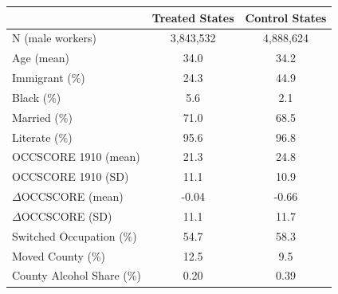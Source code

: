 
\begin{tabular}{lcc}
\toprule
 & Treated States & Control States\\
\midrule
N (male workers) & 3,843,532 & 4,888,624\\
Age (mean) & 34.0 & 34.2\\
Immigrant (\%) & 24.3 & 44.9\\
Black (\%) & 5.6 & 2.1\\
Married (\%) & 71.0 & 68.5\\
\addlinespace
Literate (\%) & 95.6 & 96.8\\
OCCSCORE 1910 (mean) & 21.3 & 24.8\\
OCCSCORE 1910 (SD) & 11.1 & 10.9\\
$\Delta$OCCSCORE (mean) & -0.04 & -0.66\\
$\Delta$OCCSCORE (SD) & 11.1 & 11.7\\
\addlinespace
Switched Occupation (\%) & 54.7 & 58.3\\
Moved County (\%) & 12.5 & 9.5\\
County Alcohol Share (\%) & 0.20 & 0.39\\
\bottomrule
\end{tabular}
